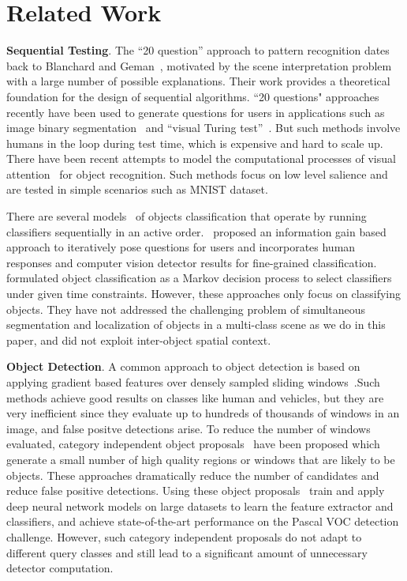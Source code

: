 \section{Related Work}
\label{sec:relatedwork}

{\bf{Sequential Testing}}. 
The ``20 question'' approach to pattern recognition dates back to Blanchard and Geman~\cite{blanchard2005hierarchical}, motivated by the scene interpretation problem with a large number of possible explanations. Their work provides a theoretical foundation for the design of sequential algorithms. ``20 questions" approaches recently have been used to generate questions for users in applications such as image binary segmentation~\cite{rupprecht2015image} and ``visual Turing test''~\cite{geman2015visual}. But such methods involve humans in the loop during test time, which is expensive and hard to scale up.  There have been recent attempts to model the computational processes of visual attention~\cite{ranzato2014learning} for object recognition. Such methods focus on low level salience and are tested in simple scenarios such as MNIST dataset. 

There are several models~\cite{gao2011active} of objects classification that operate by running classifiers sequentially in an active order.~\cite{branson2010visual} proposed an information gain based approach to iteratively pose questions for users and incorporates human responses and computer vision detector results for fine-grained classification.
~\cite{sergey2012timely} formulated object classification as a Markov decision process to select classifiers under given time constraints. However, these approaches only focus on classifying objects. They have not addressed the challenging problem of simultaneous segmentation and localization of objects in a multi-class scene as we do in this paper, and did not exploit inter-object spatial context.

{\bf Object Detection}. 
A common approach to object detection is based on applying gradient based features over densely sampled sliding windows~\cite{felzenszwalb2010object}.Such methods achieve good results on classes like human and vehicles, but they are very inefficient since they evaluate up to hundreds of thousands of windows in an image, and false positve detections arise. To reduce the number of windows evaluated,  category independent object proposals~\cite{carreira2012cpmc,van2011segmentation,arbelaez2014multiscale} have been proposed which generate a small number of high quality regions or windows that are likely to be objects. These approaches dramatically reduce the number of candidates and reduce false positive detections. Using these object proposals~\cite{girshick14CVPR, BharathECCV2014} train and apply deep neural network models on large datasets to learn the feature extractor and classifiers, and achieve state-of-the-art performance on the Pascal VOC detection challenge. However, such category independent proposals do not adapt to different query classes and still lead to a significant amount of unnecessary detector computation. 


